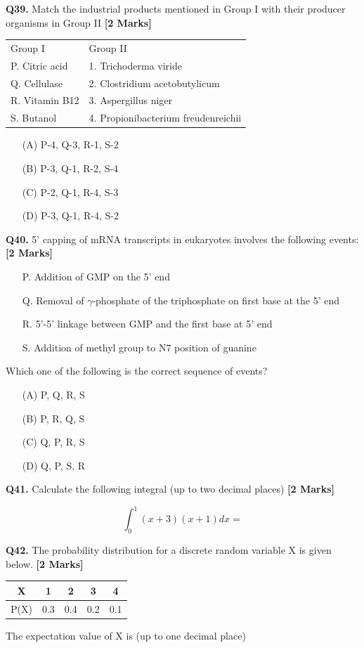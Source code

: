 \documentclass[11pt]{article}
\newcommand{\questionb}[2]{
    \noindent\textbf{Q#2.} #1 \hfill \textbf{[2 Marks]}
}
\begin{document}
\questionb{Match the industrial products mentioned in Group I with their producer organisms in Group II}{39}
\begin{tabular}{ll}
Group I & Group II \\
P. Citric acid & 1. Trichoderma viride \\
Q. Cellulase & 2. Clostridium acetobutylicum \\
R. Vitamin B12 & 3. Aspergillus niger \\
S. Butanol & 4. Propionibacterium freudenreichii \\
\end{tabular}
\begin{enumerate}
    \item[(A)] P-4, Q-3, R-1, S-2
    \item[(B)] P-3, Q-1, R-2, S-4
    \item[(C)] P-2, Q-1, R-4, S-3
    \item[(D)] P-3, Q-1, R-4, S-2
\end{enumerate}
\vspace{0.5cm}

\questionb{5' capping of mRNA transcripts in eukaryotes involves the following events:}{40}
\begin{enumerate}
    \item[P.] Addition of GMP on the 5' end
    \item[Q.] Removal of $\gamma$-phosphate of the triphosphate on first base at the 5' end
    \item[R.] 5'-5' linkage between GMP and the first base at 5' end
    \item[S.] Addition of methyl group to N7 position of guanine
\end{enumerate}
Which one of the following is the correct sequence of events?
\begin{enumerate}
    \item[(A)] P, Q, R, S
    \item[(B)] P, R, Q, S
    \item[(C)] Q, P, R, S
    \item[(D)] Q, P, S, R
\end{enumerate}
\vspace{0.5cm}

\questionb{Calculate the following integral (up to two decimal places)}{41}
\[ \int_0^1 (x + 3)(x + 1)dx = \]
\vspace{0.5cm}

\questionb{The probability distribution for a discrete random variable X is given below.}{42}
\begin{tabular}{|c|c|c|c|c|}
\hline
X & 1 & 2 & 3 & 4 \\
\hline
P(X) & 0.3 & 0.4 & 0.2 & 0.1 \\
\hline
\end{tabular}
The expectation value of X is (up to one decimal place)
\vspace{0.5cm}
\end{document}
